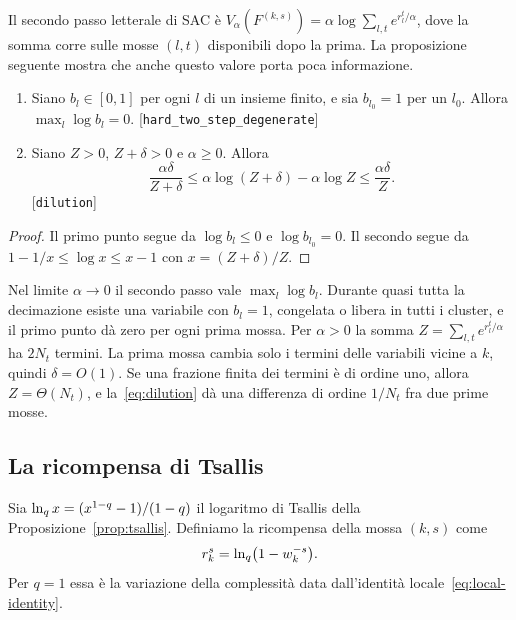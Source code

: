 Il secondo passo letterale di SAC è $V_\alpha(F^{(k,s)})=\alpha\log\sum_{l,t}e^{r_l^t/\alpha}$, dove la somma corre sulle mosse $(l,t)$ disponibili dopo la prima.
La proposizione seguente mostra che anche questo valore porta poca informazione.

\begin{proposizione}
\label{prop:degenerate}
\begin{enumerate}
\item Siano $b_l\in[0,1]$ per ogni $l$ di un insieme finito, e sia $b_{l_0}=1$ per un $l_0$. Allora $\max_l\log b_l=0$. [\texttt{hard\_two\_step\_degenerate}]
\item Siano $Z>0$, $Z+\delta>0$ e $\alpha\ge0$. Allora
\begin{equation}
\frac{\alpha\delta}{Z+\delta}\le\alpha\log(Z+\delta)-\alpha\log Z\le\frac{\alpha\delta}{Z}.
\label{eq:dilution}
\end{equation}
[\texttt{dilution}]
\end{enumerate}
\end{proposizione}

\begin{proof}
Il primo punto segue da $\log b_l\le0$ e $\log b_{l_0}=0$.
Il secondo segue da $1-1/x\le\log x\le x-1$ con $x=(Z+\delta)/Z$.
\end{proof}

Nel limite $\alpha\to0$ il secondo passo vale $\max_{l}\log b_l$.
Durante quasi tutta la decimazione esiste una variabile con $b_l=1$, congelata o libera in tutti i cluster, e il primo punto dà zero per ogni prima mossa.
Per $\alpha>0$ la somma $Z=\sum_{l,t}e^{r_l^t/\alpha}$ ha $2N_t$ termini.
La prima mossa cambia solo i termini delle variabili vicine a $k$, quindi $\delta=O(1)$.
Se una frazione finita dei termini è di ordine uno, allora $Z=\Theta(N_t)$, e la~\eqref{eq:dilution} dà una differenza di ordine $1/N_t$ fra due prime mosse.

\subsection{La ricompensa di Tsallis}

Sia $\ln_q x=(x^{1-q}-1)/(1-q)$ il logaritmo di Tsallis della Proposizione~\ref{prop:tsallis}.
Definiamo la ricompensa della mossa $(k,s)$ come
\begin{equation}
r_k^s=\ln_q\bigl(1-w_k^{-s}\bigr).
\label{eq:tsallis-reward}
\end{equation}
Per $q=1$ essa è la variazione della complessità data dall'identità locale~\eqref{eq:local-identity}.

